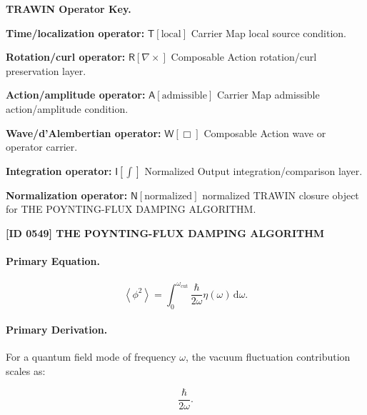 \par\vspace{0.45\baselineskip}
\noindent\begin{minipage}[t]{\linewidth}
\begingroup
\small
\raggedright
\textbf{TRAWIN Operator Key.}\par
\noindent\textbf{Time/localization operator:} $\mathsf{T}\!\left[\mathrm{local}\right]$ Carrier Map local source condition.\par
\noindent\textbf{Rotation/curl operator:} $\mathsf{R}\!\left[\nabla\times\right]$ Composable Action rotation/curl preservation layer.\par
\noindent\textbf{Action/amplitude operator:} $\mathsf{A}\!\left[\mathrm{admissible}\right]$ Carrier Map admissible action/amplitude condition.\par
\noindent\textbf{Wave/d'Alembertian operator:} $\mathsf{W}\!\left[\Box\right]$ Composable Action wave or operator carrier.\par
\noindent\textbf{Integration operator:} $\mathsf{I}\!\left[\int\right]$ Normalized Output integration/comparison layer.\par
\noindent\textbf{Normalization operator:} $\mathsf{N}\!\left[\mathrm{normalized}\right]$ normalized TRAWIN closure object for THE POYNTING-FLUX DAMPING ALGORITHM.\par
\endgroup
\end{minipage}

\clearpage
\noindent\textbf{[ID 0549] THE POYNTING-FLUX DAMPING ALGORITHM}\par
\vspace{0.35em}
\paragraph{Primary Equation.}
\begin{equation}
\left\langle\phi^2\right\rangle
=
\int_{0}^{\omega_{\mathrm{cut}}}
\frac{\hbar}{2\omega}
\eta(\omega)
\,\mathrm{d}\omega .
\end{equation}

\paragraph{Primary Derivation.}
For a quantum field mode of frequency $\omega$, the vacuum fluctuation contribution scales as:

\begin{equation}
\frac{\hbar}{2\omega}.
\end{equation}

